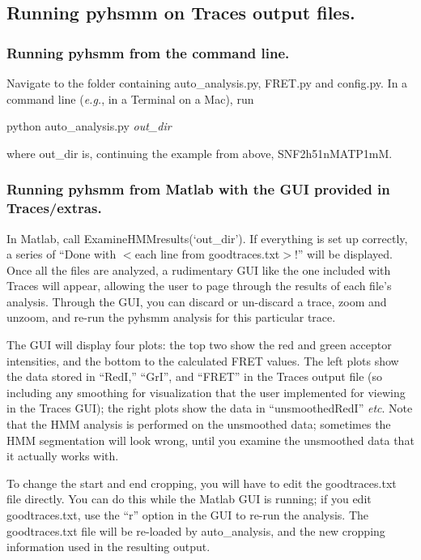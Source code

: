 \documentclass[11pt]{article}
\begin{document}
\subsection{Running pyhsmm on Traces output files.}

\subsubsection{Running pyhsmm from the command line.}

Navigate to the folder containing auto\_analysis.py, FRET.py and config.py. In a command line ({\it e.g.}, in a Terminal on a Mac), run

python auto\_analysis.py {\it out\_dir}

\noindent where out\_dir is, continuing the example from above, SNF2h51nMATP1mM.

\subsubsection{Running pyhsmm from Matlab with the GUI provided in Traces/extras.}

In Matlab, call ExamineHMMresults(`out\_dir'). If everything is set up correctly, a series of ``Done with $<$each line from goodtraces.txt$>$!'' will be displayed. Once all the files are analyzed, a rudimentary GUI like the one included with Traces will appear, allowing the user to page through the results of each file's analysis. Through the GUI, you can discard or un-discard a trace, zoom and unzoom, and re-run the pyhsmm analysis for this particular trace.

The GUI will display four plots: the top two show the red and green acceptor intensities, and the bottom to the calculated FRET values. The left plots show the data stored in ``RedI,'' ``GrI'', and ``FRET'' in the Traces output file (so including any smoothing for visualization that the user implemented for viewing in the Traces GUI); the right plots show the data in ``unsmoothedRedI'' {\it etc}. Note that the HMM analysis is performed on the unsmoothed data; sometimes the HMM segmentation will look wrong, until you examine the unsmoothed data that it actually works with.

To change the start and end cropping, you will have to edit the goodtraces.txt file directly. You can do this while the Matlab GUI is running; if you edit goodtraces.txt, use the ``r'' option in the GUI to re-run the analysis. The goodtraces.txt file will be re-loaded by auto\_analysis, and the new cropping information used in the resulting output.
\end{document}
